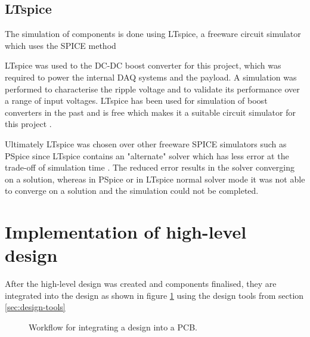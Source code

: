 \documentclass[]{report}
\newcommand*{\secref}[1]{section \hyperref[{#1}]{\ref*{#1} \nameref*{#1}}}
\begin{document}
\subsection{LTspice}

The simulation of components is done using LTspice, a freeware circuit simulator which uses the SPICE method

LTspice was used to the DC-DC boost converter for this project, which was required to power the internal DAQ systems and the payload. A simulation was performed to characterise the ripple voltage and to validate its performance over a range of input voltages. LTspice has been used for simulation of boost converters in the past and is free which makes it a suitable circuit simulator for this project \cite{giesselmann2019modeling}.

Ultimately LTspice was chosen over other freeware SPICE simulators such as PSpice since LTspice contains an "alternate" solver which has less error at the trade-off of simulation time \cite{ltspice2022}. The reduced error results in the solver converging on a solution, whereas in PSpice or in LTspice normal solver mode it was not able to converge on a solution and the simulation could not be completed.



\section{Implementation of high-level design}

After the high-level design was created and components finalised, they are integrated into the design as shown in figure \ref{fig:implementation-workflow} using the design tools from \secref{sec:design-tools}

\begin{figure}[H]
  \centering
  
  \caption{Workflow for integrating a design into a PCB.}
  \label{fig:implementation-workflow}
\end{figure}
\end{document}
